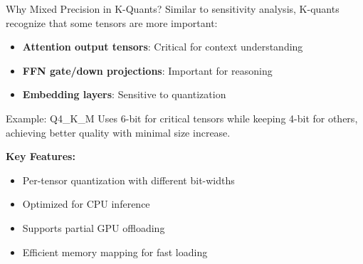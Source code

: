 \documentclass[aspectratio=169,10pt]{beamer}
\begin{document}
\begin{frame}{Why Mixed Precision in K-Quants?}
    Similar to sensitivity analysis, K-quants recognize that some tensors are more important:

    \vspace{0.3cm}
    \begin{itemize}
        \item \textbf{Attention output tensors}: Critical for context understanding
        \item \textbf{FFN gate/down projections}: Important for reasoning
        \item \textbf{Embedding layers}: Sensitive to quantization
    \end{itemize}

    \vspace{0.3cm}
    \begin{block}{Example: Q4\_K\_M}
        Uses 6-bit for critical tensors while keeping 4-bit for others, achieving better quality with minimal size increase.
    \end{block}

    \vspace{0.3cm}
    \textbf{Key Features:}
    \begin{itemize}
        \item Per-tensor quantization with different bit-widths
        \item Optimized for CPU inference
        \item Supports partial GPU offloading
        \item Efficient memory mapping for fast loading
    \end{itemize}
\end{frame}
\end{document}
